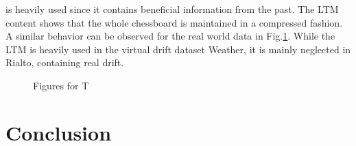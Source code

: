 \documentclass[conference]{IEEEtran}
\begin{document}
is heavily used since it contains beneficial information from the past. The LTM content shows that the whole chessboard is maintained in a compressed fashion.\\
A similar behavior can be observed for the real world data in Fig.\ref{fig:realResp}. While the LTM is heavily used in the virtual drift dataset Weather, it is mainly neglected in Rialto, containing
real drift.
\begin{figure}
\centering
\caption{Figures for T}
\label{fig:realResp}
\end{figure}

\section{Conclusion}

\newpage



%
%
%



\end{document}
